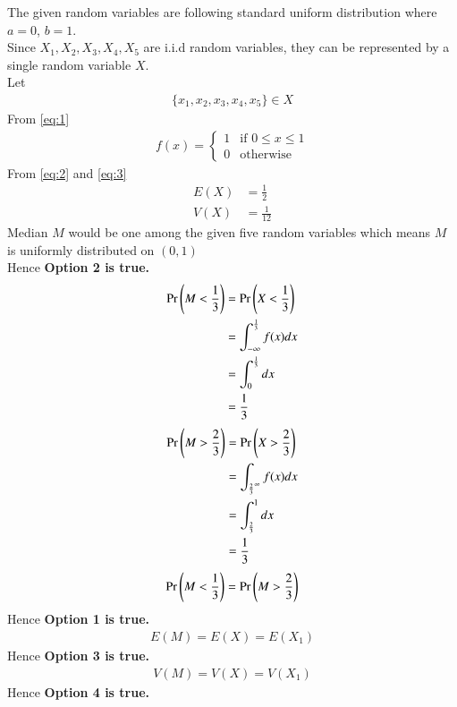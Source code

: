 \documentclass[journal,12pt,twocolumn]{IEEEtran}
\begin{document}
The given random variables are following standard uniform distribution where $a=0$, $b=1$.\\
Since $X_1,X_2,X_3,X_4,X_5$ are i.i.d random variables, they can be represented by a single random variable $X$.\\
Let 
\begin{align}
   \{x_1,x_2,x_3,x_4,x_5\} \in{X}
\end{align}
From \eqref{eq:1}
\begin{align}
    f(x)=
    \begin{cases}
    1 & \text{if } 0\leq x \leq 1\\
    0 & \text{otherwise}
    \end{cases}
\end{align}
From \eqref{eq:2} and \eqref{eq:3}
\begin{align}
    E(X)&=\frac{1}{2}\\\label{eq:4}
    V(X)&=\frac{1}{12}\label{eq:5}
\end{align}
Median $M$ would be one among the given five random variables which means $M$ is uniformly distributed on $(0,1)$
\\Hence \textbf{Option 2 is true.}
\begin{align}
    \Pr\left(M<\frac{1}{3}\right)&=\Pr\left(X<\frac{1}{3}\right)\\
    &=\int_{-\infty}^{\frac{1}{3}}f(x)dx\\
    &=\int_{0}^{\frac{1}{3}}dx\\
    &=\frac{1}{3}
\end{align}
\begin{align}
    \Pr\left(M>\frac{2}{3}\right)&=\Pr\left(X>\frac{2}{3}\right)\\
    &=\int_{\frac{2}{3}^{\infty}}f(x)dx\\
    &=\int_{\frac{2}{3}}^{1}dx\\
    &=\frac{1}{3}
\end{align}
\begin{align}
    \Pr\left(M<\frac{1}{3}\right)=\Pr\left(M>\frac{2}{3}\right)
\end{align}
Hence \textbf{Option 1 is true.}
\begin{align}
    E(M)=E(X)=E(X_1)
\end{align}
Hence \textbf{Option 3 is true.}
\begin{align}
    V(M)=V(X)=V(X_1)
\end{align}
Hence \textbf{Option 4 is true.}
\end{document}
